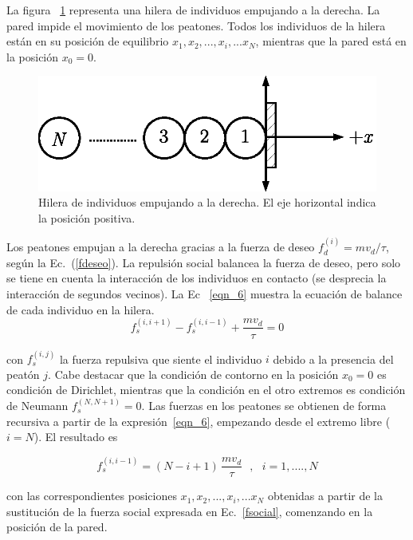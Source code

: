 La figura ~\ref{hilera2} representa una hilera de individuos empujando a la derecha. La pared impide el movimiento de los peatones. Todos los individuos de la hilera están en su posición de equilibrio $x_1,x_2,...,x_{i},...x_N$, mientras que la pared está en la posición $x_0=0$. 

\begin{figure}[!htbp]
\center
\includegraphics[scale=1]{figuras/hilera.eps}
\caption{\label{hilera2} Hilera de individuos empujando a la derecha. El eje horizontal indica la posición positiva. }
\end{figure}

Los peatones empujan a la derecha gracias a la fuerza de deseo
$f_d^{(i)}=mv_d/\tau$, según la Ec.~(\ref{fdeseo}). La repulsión social balancea la fuerza de deseo, pero solo se tiene en cuenta la interacción de los individuos en contacto (se desprecia la interacción de segundos vecinos). La Ec ~\ref{eqn_6} muestra la ecuación de balance de cada individuo en la hilera. \\

\begin{equation}
 f_s^{(i,i+1)}-f_s^{(i,i-1)}+\displaystyle\frac{mv_d}{\tau}=0\label{eqn_6}
\end{equation}

con $f_s^{(i,j)}$ la fuerza repulsiva que siente el individuo $i$ debido a la presencia del peatón $j$. Cabe destacar que la condición de contorno en la posición $x_0=0$  es condición de Dirichlet, mientras que la condición en el otro extremos es condición de Neumann $f_s^{(N,N+1)}=0$. Las fuerzas en los peatones se obtienen de forma recursiva a partir de la expresión~\ref{eqn_6}, empezando desde el extremo libre ($i=N$). El resultado es

\begin{equation}
f_s^{(i,i-1)}=(N-i+1)\,\displaystyle\frac{mv_d}{\tau}\ \ \ , \ \ \ 
i=1,....,N\label{eqn_7}
\end{equation}

con las correspondientes posiciones  $x_1,x_2,...,x_{i},...x_N$ obtenidas a partir de la sustitución de la fuerza social expresada en Ec.~\ref{fsocial}, comenzando en la posición de la pared.

